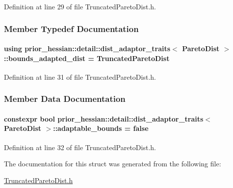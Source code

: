 Definition at line 29 of file Truncated\+Pareto\+Dist.\+h.



\subsubsection{Member Typedef Documentation}
\paragraph[{\texorpdfstring{bounds\+\_\+adapted\+\_\+dist}{bounds_adapted_dist}}]{\setlength{\rightskip}{0pt plus 5cm}using {\bf prior\+\_\+hessian\+::detail\+::dist\+\_\+adaptor\+\_\+traits}$<$ {\bf Pareto\+Dist} $>$\+::{\bf bounds\+\_\+adapted\+\_\+dist} =  {\bf Truncated\+Pareto\+Dist}}\hypertarget{structprior__hessian_1_1detail_1_1dist__adaptor__traits_3_01ParetoDist_01_4_ac747ebd8f37683894901b24971c2afc7}{}\label{structprior__hessian_1_1detail_1_1dist__adaptor__traits_3_01ParetoDist_01_4_ac747ebd8f37683894901b24971c2afc7}


Definition at line 31 of file Truncated\+Pareto\+Dist.\+h.



\subsubsection{Member Data Documentation}
\paragraph[{\texorpdfstring{adaptable\+\_\+bounds}{adaptable_bounds}}]{\setlength{\rightskip}{0pt plus 5cm}constexpr bool {\bf prior\+\_\+hessian\+::detail\+::dist\+\_\+adaptor\+\_\+traits}$<$ {\bf Pareto\+Dist} $>$\+::adaptable\+\_\+bounds = false\hspace{0.3cm}{\ttfamily [static]}}\hypertarget{structprior__hessian_1_1detail_1_1dist__adaptor__traits_3_01ParetoDist_01_4_a3537343291046bc190a3c9afde7043e0}{}\label{structprior__hessian_1_1detail_1_1dist__adaptor__traits_3_01ParetoDist_01_4_a3537343291046bc190a3c9afde7043e0}


Definition at line 32 of file Truncated\+Pareto\+Dist.\+h.



The documentation for this struct was generated from the following file\+:\begin{DoxyCompactItemize}
\item 
\hyperlink{TruncatedParetoDist_8h}{Truncated\+Pareto\+Dist.\+h}\end{DoxyCompactItemize}
